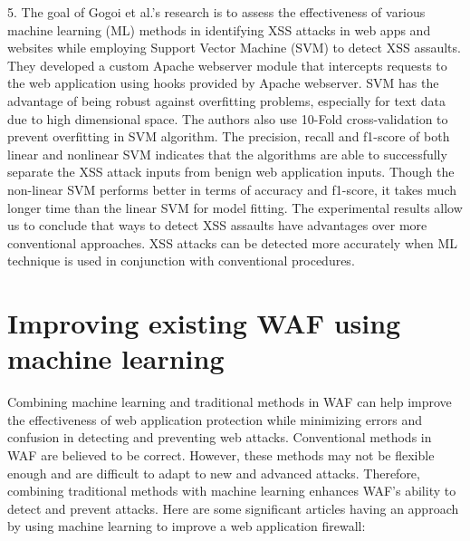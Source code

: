 5.	The goal of Gogoi et al.\cite{Gogoi}'s research is to assess the effectiveness of various machine learning (ML) methods in identifying XSS attacks in web apps and websites while employing Support Vector Machine (SVM) to detect XSS assaults. They developed a custom Apache webserver module that intercepts requests to the web application using hooks provided by Apache webserver. SVM has the advantage of being robust against overfitting problems, especially for text data due to high dimensional space. The authors also use 10-Fold cross-validation to prevent overfitting in SVM algorithm. The precision, recall and f1-score of both linear and nonlinear SVM indicates that the algorithms are able to successfully separate the XSS attack inputs from benign web application inputs.  Though the non-linear SVM performs better in terms of accuracy and f1-score, it takes much longer time than the linear SVM for model fitting. The experimental results allow us to conclude that ways to detect XSS assaults have advantages over more conventional approaches. XSS attacks can be detected more accurately when ML technique is used in conjunction with conventional procedures. 
\section{Improving existing WAF using machine learning}
\label{sec: improving_waf}
Combining machine learning and traditional methods in WAF can help improve the effectiveness of web application protection while minimizing errors and confusion in detecting and preventing web attacks. Conventional methods in WAF are believed to be correct. However, these methods may not be flexible enough and are difficult to adapt to new and advanced attacks. Therefore, combining traditional methods with machine learning enhances WAF's ability to detect and prevent attacks.
Here are some significant articles having an approach by using machine learning to improve a web application firewall: 


